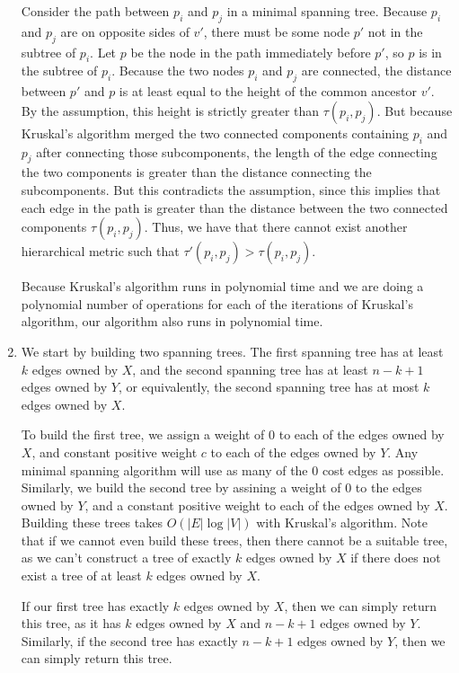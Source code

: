 \documentclass[oneside, 12pt]{article}
\begin{document}
\begin{enumerate}
Consider the path between $p_i$ and $p_j$ in a minimal spanning tree. Because $p_i$ and $p_j$ are on opposite sides of $v'$, there must be some node $p'$ not in the subtree of $p_i$. Let $p$ be the node in the path immediately before $p'$, so $p$ is in the subtree of $p_i$. Because the two nodes $p_i$ and $p_j$ are connected, the distance between $p'$ and $p$ is at least equal to the height of the common ancestor $v'$. By the assumption, this height is strictly greater than $\tau(p_i, p_j)$. But because Kruskal's algorithm merged the two connected components containing $p_i$ and $p_j$ after connecting those subcomponents, the length of the edge connecting the two components is greater than the distance connecting the subcomponents. But this contradicts the assumption, since this implies that each edge in the path is greater than the distance between the two connected components $\tau(p_i, p_j)$. Thus, we have that there cannot exist another hierarchical metric such that $\tau'(p_i, p_j) > \tau(p_i, p_j)$.

Because Kruskal's algorithm runs in polynomial time and we are doing a polynomial number of operations for each of the iterations of Kruskal's algorithm, our algorithm also runs in polynomial time.
\setcounter{enumi}{27}
\clearpage
\item
We start by building two spanning trees. The first spanning tree has at least $k$ edges owned by $X$, and the second spanning tree has at least $n - k + 1$ edges owned by $Y$, or equivalently, the second spanning tree has at most $k$ edges owned by $X$. 

To build the first tree, we assign a weight of $0$ to each of the edges owned by $X$, and constant positive weight $c$ to each of the edges owned by $Y$. Any minimal spanning algorithm will use as many of the 0 cost edges as possible. Similarly, we build the second tree by assining a weight of 0 to the edges owned by $Y$, and a constant positive weight to each of the edges owned by $X$. Building these trees takes $O(|E| \log |V|)$ with Kruskal's algorithm. Note that if we cannot even build these trees, then there cannot be a suitable tree, as we can't construct a tree of exactly $k$ edges owned by $X$ if there does not exist a tree of at least $k$ edges owned by $X$. 

If our first tree has exactly $k$ edges owned by $X$, then we can simply return this tree, as it has $k$ edges owned by $X$ and $n - k +1$ edges owned by $Y$. Similarly, if the second tree has exactly $n - k + 1$ edges owned by $Y$, then we can simply return this tree.


\end{enumerate}
\end{document}
